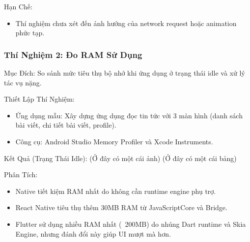 \begin{flushleft}
  \hspace*{0.8cm}Hạn Chế:
  \setlength{\leftmargini}{1.5cm}
  \begin{itemize}
      \item Thí nghiệm chưa xét đến ảnh hưởng của network request hoặc animation phức tạp.
  \end{itemize}
\end{flushleft}

\subsubsection{Thí Nghiệm 2: Đo RAM Sử Dụng}
    \begin{flushleft}
      \hspace*{0.8cm}Mục Đích: So sánh mức tiêu thụ bộ nhớ khi ứng dụng ở trạng thái idle và xử lý tác vụ nặng.
    \end{flushleft}

    \begin{flushleft}
      \hspace*{0.8cm}Thiết Lập Thí Nghiệm:
      \setlength{\leftmargini}{1.5cm}
      \begin{itemize}
        \item Ứng dụng mẫu: Xây dựng ứng dụng đọc tin tức với 3 màn hình (danh sách bài viết, chi tiết bài viết, profile).
        \item Công cụ: Android Studio Memory Profiler và Xcode Instruments.
      \end{itemize}
    \end{flushleft}

    \begin{flushleft}
      \hspace*{0.8cm}Kết Quả (Trạng Thái Idle): (Ở đây có một cái ảnh) (Ở đây có một cái bảng)
    \end{flushleft}

    \begin{flushleft}
      \hspace*{0.8cm}Phân Tích:
      \setlength{\leftmargini}{1.5cm}
      \begin{itemize}
          \item Native tiết kiệm RAM nhất do không cần runtime engine phụ trợ.
          \item React Native tiêu thụ thêm 30MB RAM từ JavaScriptCore và Bridge.
          \item Flutter sử dụng nhiều RAM nhất (~200MB) do nhúng Dart runtime và Skia Engine, nhưng đánh đổi này giúp UI mượt mà hơn.
      \end{itemize}
    \end{flushleft}

